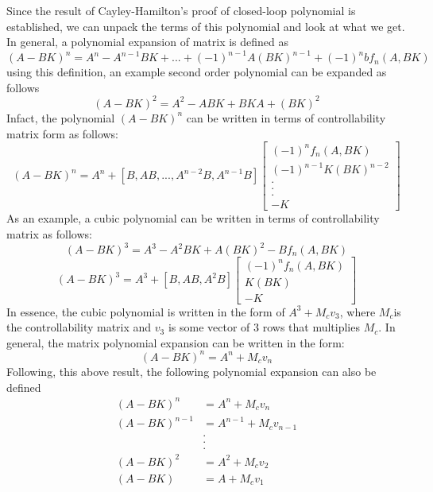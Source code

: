 Since the result of Cayley-Hamilton's proof of closed-loop polynomial is established, we can unpack the terms of this polynomial and look at what we get. In general, a polynomial expansion of matrix is defined as
\begin{equation}
	(A - BK)^{n} = A^{n} - A^{n-1}BK + ... + (-1)^{n-1} A(BK)^{n-1} + (-1)^{n} b f_{n}(A,BK)
\end{equation}
using this definition, an example second order polynomial can be expanded as follows
\begin{equation}
	(A - BK)^{2} = A^{2} - A BK + BKA + (BK)^{2}
\end{equation}
Infact, the polynomial $(A - BK)^{n}$ can be written in terms of controllability matrix form as follows:
\begin{equation} \label{Eq_Ack_1}
	(A - BK)^{n} = A^{n} + [B, AB, ..., A^{n-2}B, A^{n-1}B] \begin{bmatrix}
		(-1)^n f_{n}(A,BK) \\ (-1)^{n-1} K (BK)^{n-2} \\ . \\ . \\. \\ -K
	\end{bmatrix}
\end{equation}
As an example, a cubic polynomial can be written in terms of controllability matrix as follows:
\begin{equation}
	(A - BK)^{3} = A^{3} - A^{2}BK + A(BK)^2 - Bf_{n}(A,BK)
\end{equation}
\begin{equation}
	(A - BK)^{3} = A^{3} + [B,AB, A^{2}B] \begin{bmatrix}
	(-1)^n f_{n}(A,BK) \\ K (BK) \\ -K
	\end{bmatrix}
\end{equation}
In essence, the cubic polynomial is written in the form of $A^{3}+ M_{c}v_{3}$, where $M_{c}$is the controllability matrix and $v_{3}$ is some vector of 3 rows that multiplies $M_{c}$. In general, the matrix polynomial expansion can be written in the form:
\begin{equation}
	(A - BK)^{n} = A^{n}+ M_{c}v_{n}
\end{equation}
Following, this above result, the following polynomial expansion can also be defined
\begin{align}
	(A - BK)^{n} &= A^{n}+ M_{c}v_{n} \\
	(A - BK)^{n-1} &= A^{n-1}+ M_{c}v_{n-1} \\
				&. \\
				&. \\
				&. \\
	(A - BK)^{2} &= A^{2}+ M_{c}v_{2} \\
	(A - BK) &= A+ M_{c}v_{1}	
\end{align}
